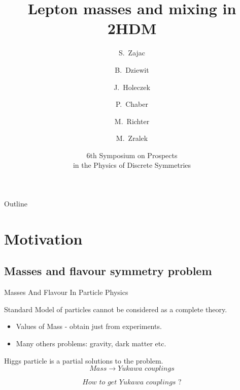 \documentclass{beamer}
\title[Lepton masses and mixing in 2HDM] 
{Lepton masses and mixing in 2HDM}
\author[S.Zajac et all] %
{S.~Zajac\inst{1} \and B.~Dziewit\inst{2} \and J.~Holeczek\inst{2} \and P.~Chaber\inst{2} \and M.~Richter\inst{2} \and M.~Zralek\inst{2}}
\institute[] %
{
  \inst{1}%
  Faculty of Mathematics and Natural Studies\\
  Cardinal Stefan Wyszyński University
  \and
  \inst{2}%
  Institute of Physics\\
  University of Silesia}
\date[DISCRETE 2018] %
{6th Symposium on Prospects \\in the Physics of Discrete Symmetries}
\begin{document}
\begin{frame}
  \titlepage
\end{frame}

\begin{frame}{Outline}
  \tableofcontents
\end{frame}





\section{Motivation}

\subsection{Masses and flavour symmetry problem}

\begin{frame}{Masses And Flavour In Particle Physics}

Standard Model of particles cannot be considered as a complete theory.
  \begin{itemize}
  \item
    Values of Mass - obtain just from experiments. 
  \item
    Many others problems: gravity, dark matter etc.
  \end{itemize}
  
Higgs particle is a partial solutions to the problem.$$ Mass \to Yukawa \,\, couplings $$

$$How\,\, to\,\, get\,\, Yukawa\,\, couplings\,\, ?$$ 
\end{frame}
\end{document}
